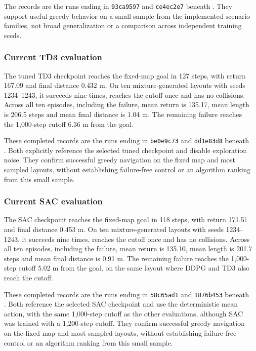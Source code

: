\documentclass[11pt,a4paper]{article}
\theoremstyle{definition}
\theoremstyle{plain}
\theoremstyle{remark}
\newcommand{\code}[1]{\texttt{#1}}
\begin{document}
The records are the runs ending in \code{93ca9597} and \code{ce4ec2e7} beneath . They support useful greedy behavior on a small sample from the implemented scenario families, not broad generalization or a comparison across independent training seeds.

\subsubsection{Current TD3 evaluation}

The tuned TD3 checkpoint reaches the fixed-map goal in 127 steps, with return 167.09 and final distance 0.432 m. On ten mixture-generated layouts with seeds 1234--1243, it succeeds nine times, reaches the cutoff once and has no collisions. Across all ten episodes, including the failure, mean return is 135.17, mean length is 206.5 steps and mean final distance is 1.04 m. The remaining failure reaches the 1,000-step cutoff 6.36 m from the goal.

These completed records are the runs ending in \code{be0e9c73} and \code{dd1e83d8} beneath . Both explicitly reference the selected tuned checkpoint and disable exploration noise. They confirm successful greedy navigation on the fixed map and most sampled layouts, without establishing failure-free control or an algorithm ranking from this small sample.

\subsubsection{Current SAC evaluation}

The SAC checkpoint reaches the fixed-map goal in 118 steps, with return 171.51 and final distance 0.453 m. On ten mixture-generated layouts with seeds 1234--1243, it succeeds nine times, reaches the cutoff once and has no collisions. Across all ten episodes, including the failure, mean return is 135.10, mean length is 201.7 steps and mean final distance is 0.91 m. The remaining failure reaches the 1,000-step cutoff 5.02 m from the goal, on the same layout where DDPG and TD3 also reach the cutoff.

These completed records are the runs ending in \code{58c65ad1} and \code{1876b453} beneath . Both reference the selected SAC checkpoint and use the deterministic mean action, with the same 1,000-step cutoff as the other evaluations, although SAC was trained with a 1,200-step cutoff. They confirm successful greedy navigation on the fixed map and most sampled layouts, without establishing failure-free control or an algorithm ranking from this small sample.
\end{document}
